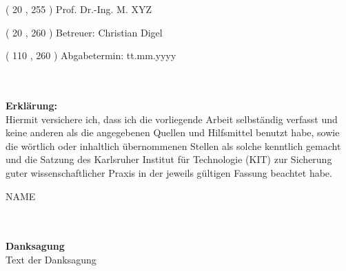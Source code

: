 \begin{textblock}{80}( 20 , 255 )
\large
\noindent
Prof. Dr.-Ing. M. XYZ															%
\end{textblock}

\begin{textblock}{80}( 20 , 260 )
\large
\flushleft
\noindent
Betreuer: Christian Digel                              									%
\end{textblock}

\begin{textblock}{80}( 110 , 260 )
\flushright
\large
Abgabetermin: tt.mm.yyyy                        									%
\end{textblock}

\null\newpage

\thispagestyle{empty}
\newpage

\cleardoublepage
\thispagestyle{empty}
\hspace{2cm}\\
\vspace{16cm}\\
\textbf{Erklärung:}\\
Hiermit versichere ich, dass ich die vorliegende Arbeit selbständig verfasst und keine anderen als die angegebenen Quellen und Hilfsmittel benutzt habe, sowie die wörtlich oder inhaltlich übernommenen Stellen als solche kenntlich gemacht und die Satzung des Karlsruher Institut für Technologie (KIT) zur Sicherung guter wissenschaftlicher Praxis in der jeweils gültigen Fassung beachtet habe.
\vspace*{\fill}

NAME   %


\null\newpage
\thispagestyle{empty}
\newpage
\cleardoublepage
\thispagestyle{empty}
\hspace{2cm}\\
\vspace{18cm}\\
\textbf{Danksagung}\\
Text der Danksagung\\
\null\newpage
\thispagestyle{empty}
\newpage
\cleardoublepage

